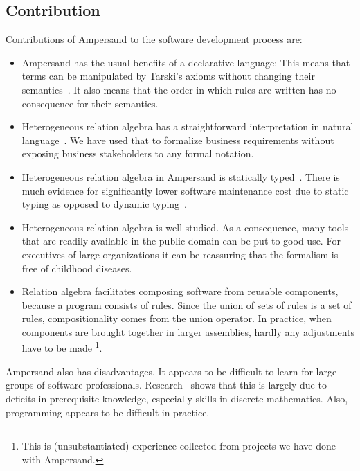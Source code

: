 \documentclass{elsarticle}
\begin{document}
\subsection{Contribution}
\label{sct:Contribution}
	Contributions of Ampersand to the software development process are:
\begin{itemize}
\item	Ampersand has the usual benefits of a declarative language:
	This means that terms can be manipulated by Tarski's axioms without changing their semantics~\cite{vdWoude2011}.
	It also means that the order in which rules are written has no consequence for their semantics.
\item	Heterogeneous relation algebra has a straightforward interpretation in natural language~\cite{RBD}.
	We have used that to formalize business requirements without exposing business stakeholders to any formal notation.
\item	Heterogeneous relation algebra in Ampersand is statically typed~\cite{Joosten2015}.
	There is much evidence for significantly lower software maintenance cost due to static typing as opposed to dynamic typing~\cite{HanenbergKRTS14,Petersen2014}.
\item	Heterogeneous relation algebra is well studied.
	As a consequence, many tools that are readily available in the public domain can be put to good use.
	For executives of large organizations it can be reassuring that the formalism is free of childhood diseases.
\item	Relation algebra facilitates composing software from reusable components, because a program consists of rules.
	Since the union of sets of rules is a set of rules, compositionality comes from the union operator.
	In practice, when components are brought together in larger assemblies, hardly any adjustments have to be made%
\footnote{This is (unsubstantiated) experience collected from projects we have done with Ampersand.}.
\end{itemize}

	Ampersand also has disadvantages. It appears to be difficult to learn for large groups of software professionals.
	Research~\cite{Michels2015} shows that this is largely due to deficits in prerequisite knowledge, especially skills in discrete mathematics.
	Also, programming appears to be difficult in practice.
\end{document}
